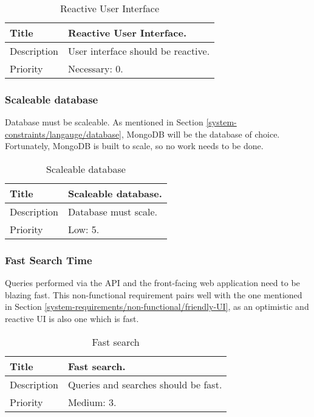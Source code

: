   \begin{table}[h!]
    \caption{Reactive User Interface}
    \label{system-requirements/non-functional/reactive-UI-table}
    \begin{tabularx}{\textwidth}{|l|X|}
      \hline
      Title           & Reactive User Interface. \\ \hline
      Description     & User interface should be reactive.\\ \hline
      Priority        & Necessary: 0. \\ \hline
    \end{tabularx}
  \end{table}

\subsubsection{Scaleable database}
  Database must be scaleable. As mentioned in Section
  \ref{system-constraints/langauge/database}, MongoDB will be the database of
  choice. Fortunately, MongoDB is built to scale, so no work needs to be done.

  \begin{table}[h!]
    \caption{Scaleable database}
    \label{system-requirements/non-functional/scaleable-database-table}
    \begin{tabularx}{\textwidth}{|l|X|}
      \hline
      Title           & Scaleable database. \\ \hline
      Description     & Database must scale.\\ \hline
      Priority        & Low: 5. \\ \hline
    \end{tabularx}
  \end{table}

\subsubsection{Fast Search Time}
  Queries performed via the API and the front-facing web application need to be
  blazing fast. This non-functional requirement pairs well with the one
  mentioned in Section \ref{system-requirements/non-functional/friendly-UI}, as
  an optimistic and reactive UI is also one which is fast.

  \begin{table}[h!]
    \caption{Fast search}
    \label{system-requirements/non-functional/fast-search}
    \begin{tabularx}{\textwidth}{|l|X|}
      \hline
      Title           & Fast search. \\ \hline
      Description     & Queries and searches should be fast.\\ \hline
      Priority        & Medium: 3. \\ \hline
    \end{tabularx}
  \end{table}
